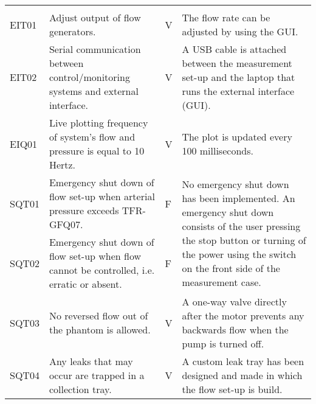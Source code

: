 \begin{longtable}{m{1.5cm}|m{5.25cm}>{\centering\arraybackslash}m{1cm}m{5.75cm}|}
					& & & \\
		EIT01	& Adjust output of flow generators. & \cellcolor{green!50}V & The flow rate can be adjusted by using the GUI. \\
		EIT02	& Serial communication between control/monitoring systems and external interface. & \cellcolor{green!50}V & A USB cable is attached between the measurement set-up and the laptop that runs the external interface (GUI). \\
		EIQ01	& Live plotting frequency of system's flow and pressure is equal to 10 Hertz. & \cellcolor{green!50}V & The plot is updated every 100 milliseconds. \\
		SQT01	& Emergency shut down of flow set-up when arterial pressure exceeds TFR-GFQ07. & \cellcolor{red!50}F & \multirow{2}{5.75cm}[1em]{No emergency shut down has been implemented. An emergency shut down consists of the user pressing the stop button or turning of the power using the switch on the front side of the measurement case.} \\
		SQT02	& Emergency shut down of flow set-up when flow cannot be controlled, i.e. erratic or absent.  & \cellcolor{red!50}F & \\
		SQT03	& No reversed flow out of the phantom is allowed. & \cellcolor{green!50}V & A one-way valve directly after the motor prevents any backwards flow when the pump is turned off. \\
		SQT04	& Any leaks that may occur are trapped in a collection tray. & \cellcolor{green!50}V & A custom leak tray has been designed and made in which the flow set-up is build.
	\end{longtable}


